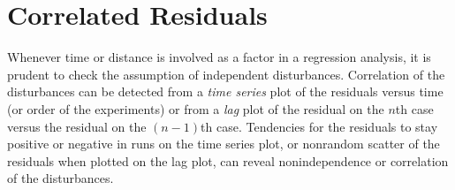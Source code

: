 \section{Correlated Residuals}

Whenever time or distance is involved as a factor in a regression analysis,
it is prudent to check the assumption of independent disturbances.
Correlation of the disturbances can be detected from
a {\em time series\/}
plot of the residuals versus time (or
order of the experiments) or from a {\em lag\/} plot of the
residual on the $n$th case versus the residual on the
$(n - 1 )$th case.
Tendencies for the residuals to stay positive or negative in runs
on the time series plot, or nonrandom scatter of the residuals when
plotted on the lag plot, can reveal nonindependence or
correlation of the disturbances.

